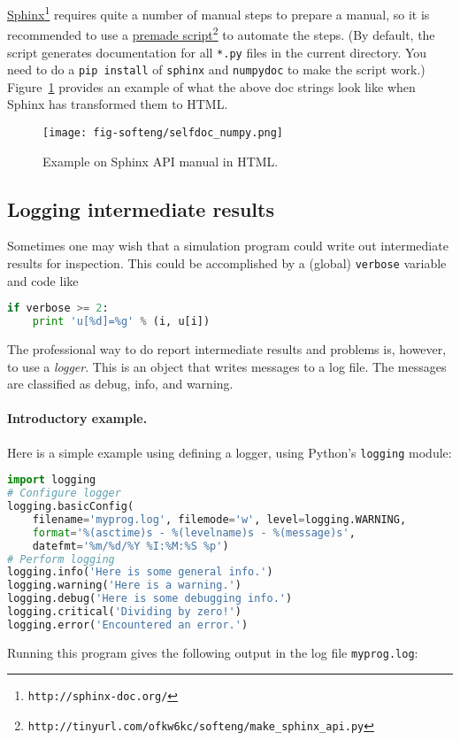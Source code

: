 \documentclass[graybox,sectrefs,envcountresetchap,open=right,final]{svmonodo}
\begin{document}
\href{{http://sphinx-doc.org/}}{Sphinx}\footnote{\texttt{http://sphinx-doc.org/}} requires quite a number of manual steps to
prepare a manual, so it is
recommended to use a \href{{http://tinyurl.com/ofkw6kc/softeng/make_sphinx_api.py}}{premade script}\footnote{\texttt{http://tinyurl.com/ofkw6kc/softeng/make\_sphinx\_api.py}} to automate the steps. (By default,
the script generates documentation for all \texttt{*.py} files in the
current directory.
You need to do a \texttt{pip install} of \texttt{sphinx} and \texttt{numpydoc} to make the
script work.)
Figure~\ref{softeng1:basic:docstring:fig} provides an example of what
the above doc strings look like when Sphinx has transformed them to HTML.


\begin{figure}[!ht]  %
  \centerline{\texttt{[image: fig-softeng/selfdoc\_numpy.png]}}
  \caption{
  Example on Sphinx API manual in HTML. \label{softeng1:basic:docstring:fig}
  }
\end{figure}


\subsection{Logging intermediate results}
\label{softeng1:basic:logging}


Sometimes one may wish that a simulation program could write out
intermediate results for inspection. This could be accomplished by
a (global) \texttt{verbose} variable and code like

\begin{lstlisting}[language=Python,style=blue1_bluegreen]
if verbose >= 2:
    print 'u[%d]=%g' % (i, u[i])
\end{lstlisting}
The professional way to do report intermediate results and problems is,
however, to use a \emph{logger}. This is an object that writes messages
to a log file. The messages are classified as debug, info, and warning.

\paragraph{Introductory example.}
Here is a simple example using defining a logger, using Python's \texttt{logging}
module:

\begin{lstlisting}[language=Python,style=blue1bar_bluegreen]
import logging
# Configure logger
logging.basicConfig(
    filename='myprog.log', filemode='w', level=logging.WARNING,
    format='%(asctime)s - %(levelname)s - %(message)s',
    datefmt='%m/%d/%Y %I:%M:%S %p')
# Perform logging
logging.info('Here is some general info.')
logging.warning('Here is a warning.')
logging.debug('Here is some debugging info.')
logging.critical('Dividing by zero!')
logging.error('Encountered an error.')
\end{lstlisting}
Running this program gives the following output in the log file \texttt{myprog.log}:
\end{document}
